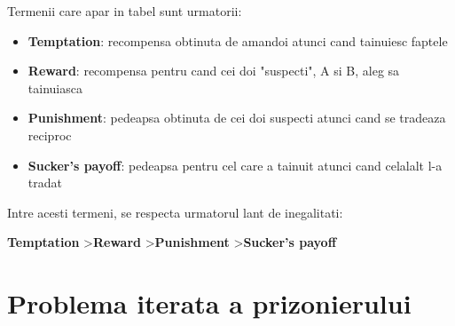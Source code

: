 Termenii care apar in tabel sunt urmatorii:

\begin{itemize}
	\item \textbf{Temptation}: recompensa obtinuta de amandoi atunci cand tainuiesc faptele
	\item \textbf{Reward}: recompensa pentru cand cei doi "suspecti", A si B, aleg sa tainuiasca
	\item \textbf{Punishment}: pedeapsa obtinuta de cei doi suspecti atunci cand se tradeaza reciproc
	\item \textbf{Sucker's payoff}: pedeapsa pentru cel care a tainuit atunci cand celalalt l-a tradat
\end{itemize}

Intre acesti termeni, se respecta urmatorul lant de inegalitati:

\begin{center}
	 \textbf{Temptation} \textgreater \textbf{Reward} \textgreater \textbf{Punishment} \textgreater \textbf{Sucker's payoff}
\end{center}

\section {Problema iterata a prizonierului}


